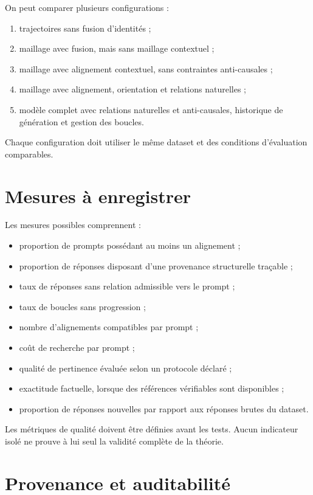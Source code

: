 \documentclass[11pt,a4paper]{report}
\theoremstyle{definition}
\theoremstyle{plain}
\theoremstyle{remark}
\begin{document}
On peut comparer plusieurs configurations :
\begin{enumerate}[label=\arabic*.]
  \item trajectoires sans fusion d'identités ;
  \item maillage avec fusion, mais sans maillage contextuel ;
  \item maillage avec alignement contextuel, sans contraintes
        anti-causales ;
  \item maillage avec alignement, orientation et relations
        naturelles ;
  \item modèle complet avec relations naturelles et
        anti-causales, historique de génération et gestion des
        boucles.
\end{enumerate}

Chaque configuration doit utiliser le même dataset et des
conditions d'évaluation comparables.

\section{Mesures à enregistrer}

Les mesures possibles comprennent :
\begin{itemize}
  \item proportion de prompts possédant au moins un alignement ;
  \item proportion de réponses disposant d'une provenance
        structurelle traçable ;
  \item taux de réponses sans relation admissible vers le prompt ;
  \item taux de boucles sans progression ;
  \item nombre d'alignements compatibles par prompt ;
  \item coût de recherche par prompt ;
  \item qualité de pertinence évaluée selon un protocole déclaré ;
  \item exactitude factuelle, lorsque des références vérifiables
        sont disponibles ;
  \item proportion de réponses nouvelles par rapport aux réponses
        brutes du dataset.
\end{itemize}

Les métriques de qualité doivent être définies avant les tests.
Aucun indicateur isolé ne prouve à lui seul la validité complète
de la théorie.

\section{Provenance et auditabilité}
\end{document}

